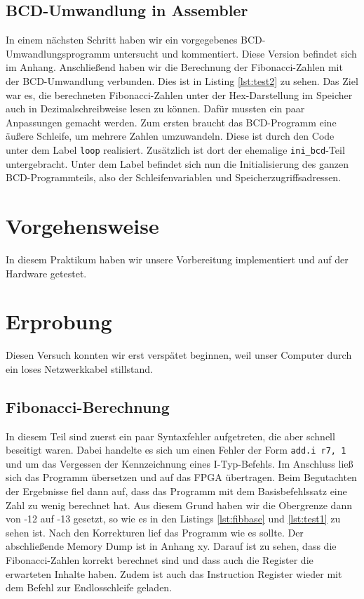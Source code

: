 \documentclass[12pt,a4paper]{scrartcl}
\begin{document}
\subsection*{BCD-Umwandlung in Assembler}
In einem n\"achsten Schritt haben wir ein vorgegebenes BCD-Umwandlungsprogramm untersucht und kommentiert.
Diese Version befindet sich im Anhang.
Anschlie\ss{}end haben wir die Berechnung der Fibonacci-Zahlen mit der BCD-Umwandlung verbunden.
Dies ist in Listing \ref{lst:test2} zu sehen.
Das Ziel war es, die berechneten Fibonacci-Zahlen unter der Hex-Darstellung im Speicher auch in Dezimalschreibweise lesen zu k\"onnen.
Daf\"ur mussten ein paar Anpassungen gemacht werden.
Zum ersten braucht das BCD-Programm eine \"au\ss{}ere Schleife, um mehrere Zahlen umzuwandeln.
Diese ist durch den Code unter dem Label \texttt{loop} realisiert.
Zus\"atzlich ist dort der ehemalige \texttt{ini\_bcd}-Teil untergebracht. 
Unter dem Label befindet sich nun die Initialisierung des ganzen BCD-Programmteils, also der Schleifenvariablen und Speicherzugriffsadressen.

\section{Vorgehensweise}
In diesem Praktikum haben wir unsere Vorbereitung implementiert und auf der Hardware getestet.

\section{Erprobung}
Diesen Versuch konnten wir erst versp\"atet beginnen, weil unser Computer durch ein loses Netzwerkkabel stillstand.

\subsection*{Fibonacci-Berechnung}
In diesem Teil sind zuerst ein paar Syntaxfehler aufgetreten, die aber schnell beseitigt waren.
Dabei handelte es sich um einen Fehler der Form \texttt{add.i r7, 1} und um das Vergessen der Kennzeichnung eines I-Typ-Befehls.
Im Anschluss lie\ss{} sich das Programm \"ubersetzen und auf das FPGA \"ubertragen.
Beim Begutachten der Ergebnisse fiel dann auf, dass das Programm mit dem Basisbefehlssatz eine Zahl zu wenig berechnet hat.
Aus diesem Grund haben wir die Obergrenze dann von -12 auf -13 gesetzt, so wie es in den Listings \ref{lst:fibbase} und \ref{lst:test1} zu sehen ist.
Nach den Korrekturen lief das Programm wie es sollte.
Der abschlie\ss{}ende Memory Dump ist in Anhang xy.
Darauf ist zu sehen, dass die Fibonacci-Zahlen korrekt berechnet sind und dass auch die Register die erwarteten Inhalte haben.
Zudem ist auch das Instruction Register wieder mit dem Befehl zur Endlosschleife geladen.
\end{document}
